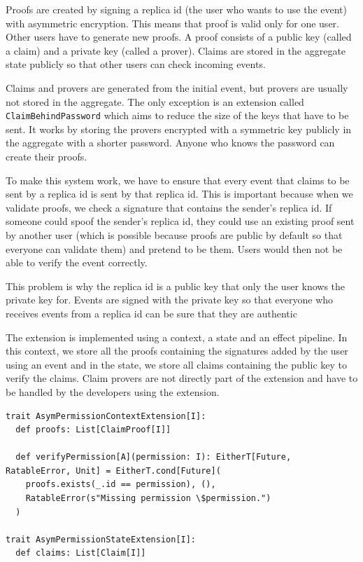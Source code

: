 \documentclass[
	english,
	ruledheaders=section,   %
	class=report,		    %
	thesis={type=bachelor}, %
	accentcolor=9c,			%
	custommargins=true,    %
	marginpar=false,        %
	parskip=half-,          %
	fontsize=11pt,          %
]{tudapub}
\begin{document}
Proofs are created by signing a replica id (the user who wants to use the event) with asymmetric encryption. This means that proof is valid only for one user. Other users have to generate new proofs. A proof consists of a public key (called a claim) and a private key (called a prover). Claims are stored in the aggregate state publicly so that other users can check incoming events.

Claims and provers are generated from the initial event, but provers are usually not stored in the aggregate. The only exception is an extension called \texttt{ClaimBehindPassword} which aims to reduce the size of the keys that have to be sent. It works by storing the provers encrypted with a symmetric key publicly in the aggregate with a shorter password. Anyone who knows the password can create their proofs.

To make this system work, we have to ensure that every event that claims to be sent by a replica id is sent by that replica id. This is important because when we validate proofs, we check a signature that contains the sender's replica id. If someone could spoof the sender's replica id, they could use an existing proof sent by another user (which is possible because proofs are public by default so that everyone can validate them) and pretend to be them. Users would then not be able to verify the event correctly.

This problem is why the replica id is a public key that only the user knows the private key for. Events are signed with the private key so that everyone who receives events from a replica id can be sure that they are authentic

The extension is implemented using a context, a state and an effect pipeline. In this context, we store all the proofs containing the signatures added by the user using an event and in the state, we store all claims containing the public key to verify the claims. Claim provers are not directly part of the extension and have to be handled by the developers using the extension.

\begin{lstlisting}
trait AsymPermissionContextExtension[I]:
  def proofs: List[ClaimProof[I]]

  def verifyPermission[A](permission: I): EitherT[Future, RatableError, Unit] = EitherT.cond[Future](
    proofs.exists(_.id == permission), (),
    RatableError(s"Missing permission \$permission.")
  )

trait AsymPermissionStateExtension[I]:
  def claims: List[Claim[I]]
\end{lstlisting}
\end{document}
